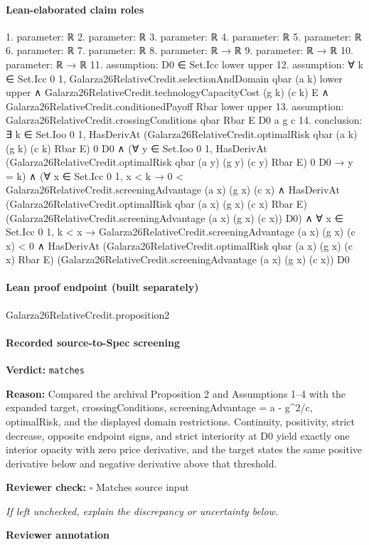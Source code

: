 \documentclass[10pt]{article}
\newcommand{\reviewerbox}{%
  \par\noindent\fbox{\parbox{0.96\linewidth}{\rule{0pt}{0.38in}}}\par
}
\newcommand{\reviewmatch}[1]{%
  \par\noindent\textbf{Reviewer check:} $\square$\; #1\par
  \noindent\emph{If left unchecked, explain the discrepancy or uncertainty below.}\par
}
\begin{document}
\paragraph{Lean-elaborated claim roles}\begin{ReviewVerbatim}
1. parameter: ℝ
2. parameter: ℝ
3. parameter: ℝ
4. parameter: ℝ
5. parameter: ℝ
6. parameter: ℝ
7. parameter: ℝ
8. parameter: ℝ → ℝ
9. parameter: ℝ → ℝ
10. parameter: ℝ → ℝ
11. assumption: D0 ∈ Set.Icc lower upper
12. assumption: ∀ k ∈ Set.Icc 0 1,
  Galarza26RelativeCredit.selectionAndDomain qbar (a k) lower upper ∧
    Galarza26RelativeCredit.technologyCapacityCost (g k) (c k) E ∧
      Galarza26RelativeCredit.conditionedPayoff Rbar lower upper
13. assumption: Galarza26RelativeCredit.crossingConditions qbar Rbar E D0 a g c
14. conclusion: ∃ k ∈ Set.Ioo 0 1,
  HasDerivAt (Galarza26RelativeCredit.optimalRisk qbar (a k) (g k) (c k) Rbar E) 0 D0 ∧
    (∀ y ∈ Set.Ioo 0 1, HasDerivAt (Galarza26RelativeCredit.optimalRisk qbar (a y) (g y) (c y) Rbar E) 0 D0 → y = k) ∧
      (∀ x ∈ Set.Icc 0 1,
          x < k →
            0 < Galarza26RelativeCredit.screeningAdvantage (a x) (g x) (c x) ∧
              HasDerivAt (Galarza26RelativeCredit.optimalRisk qbar (a x) (g x) (c x) Rbar E)
                (Galarza26RelativeCredit.screeningAdvantage (a x) (g x) (c x)) D0) ∧
        ∀ x ∈ Set.Icc 0 1,
          k < x →
            Galarza26RelativeCredit.screeningAdvantage (a x) (g x) (c x) < 0 ∧
              HasDerivAt (Galarza26RelativeCredit.optimalRisk qbar (a x) (g x) (c x) Rbar E)
                (Galarza26RelativeCredit.screeningAdvantage (a x) (g x) (c x)) D0
\end{ReviewVerbatim}

\paragraph{Lean proof endpoint (built separately)}\begin{ReviewVerbatim}
Galarza26RelativeCredit.proposition2
\end{ReviewVerbatim}

\paragraph{Recorded source-to-Spec screening}
\textbf{Verdict:} \texttt{matches}
\\
{\raggedright
\textbf{Reason:} Compared the archival Proposition 2 and Assumptions 1–4 with the expanded target, crossingConditions, screeningAdvantage = a -\allowbreak{} g\textasciicircum{}2/\allowbreak{}c, optimalRisk, and the displayed domain restrictions.\allowbreak{} Continuity, positivity, strict decrease, opposite endpoint signs, and strict interiority at D0 yield exactly one interior opacity with zero price derivative, and the target states the same positive derivative below and negative derivative above that threshold.\allowbreak{}
\par}
\reviewmatch{Matches source input}
\noindent\textbf{Reviewer annotation}\par
\reviewerbox
\clearpage
\hypertarget{source-claim-194f750a63a93998}{}
\end{document}
